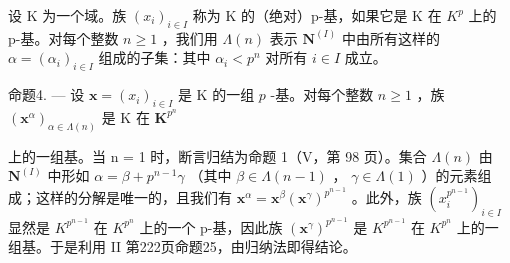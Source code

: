 设 K 为一个域。族 \((x_{i})_{i\in I}\) 称为 K 的（绝对）p-基，如果它是 K 在 \(K^{p}\) 上的 p-基。对每个整数 \(n\geqslant1\) ，我们用 \(\Lambda(n)\) 表示 \(\mathbf{N}^{(I)}\) 中由所有这样的 \(\alpha=(\alpha_{i})_{i\in I}\) 组成的子集：其中 \(\alpha_{i}<p^{n}\) 对所有 \(i\in I\) 成立。

命题4. --- 设 \(\mathbf{x} = (x_i)_{i \in I}\) 是 K 的一组 \(p\) -基。对每个整数 \(n \geqslant 1\) ，族 \((\mathbf{x}^\alpha)_{\alpha \in \Lambda(n)}\) 是 K 在 \(\mathbf{K}^{p^n}\)

上的一组基。当 n = 1 时，断言归结为命题 1（V，第 98 页）。集合 \(\Lambda(n)\) 由 \(\mathbf{N}^{(I)}\) 中形如 \(\alpha = \beta + p^{n-1}\gamma\) （其中 \(\beta \in \Lambda(n-1)\) ， \(\gamma \in \Lambda(1)\) ）的元素组成；这样的分解是唯一的，且我们有 \(\mathbf{x}^{\alpha} = \mathbf{x}^{\beta}(\mathbf{x}^{\gamma})^{p^{n-1}}\) 。此外，族 \((x_{i}^{p^{n-1}})_{i \in I}\) 显然是 \(K^{p^{n-1}}\) 在 \(K^{p^n}\) 上的一个 p-基，因此族 \((\mathbf{x}^{\gamma})^{p^{n-1}}\) 是 \(K^{p^{n-1}}\) 在 \(K^{p^n}\) 上的一组基。于是利用 II 第222页命题25，由归纳法即得结论。

